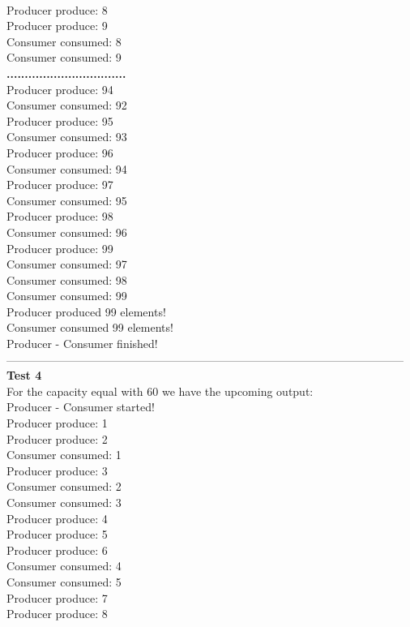 \documentclass[14pt]{article}
\begin{document}
\\Producer produce: 8
\\Producer produce: 9
\\Consumer consumed: 8
\\Consumer consumed: 9
\\\textbf{.................................}
\\Producer produce: 94
\\Consumer consumed: 92
\\Producer produce: 95
\\Consumer consumed: 93
\\Producer produce: 96
\\Consumer consumed: 94
\\Producer produce: 97
\\Consumer consumed: 95
\\Producer produce: 98
\\Consumer consumed: 96
\\Producer produce: 99
\\Consumer consumed: 97
\\Consumer consumed: 98
\\Consumer consumed: 99
\\Producer produced 99 elements!
\\Consumer consumed 99 elements!
\\Producer - Consumer finished!
\\---------------------------------------------------------------------------------------------------------
\\\textbf{Test 4}
\\For the capacity equal with 60 we have the upcoming output:
\\Producer - Consumer started!
\\Producer produce: 1
\\Producer produce: 2
\\Consumer consumed: 1
\\Producer produce: 3
\\Consumer consumed: 2
\\Consumer consumed: 3
\\Producer produce: 4
\\Producer produce: 5
\\Producer produce: 6
\\Consumer consumed: 4
\\Consumer consumed: 5
\\Producer produce: 7
\\Producer produce: 8
\end{document}
